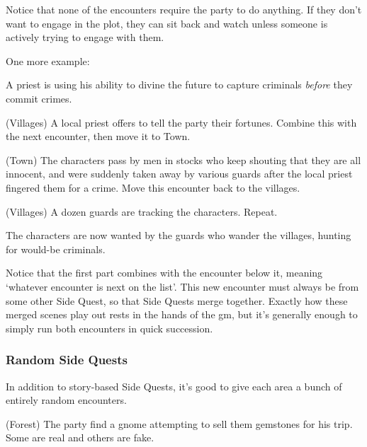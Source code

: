 \begin{multicols}{2}
Notice that none of the encounters require the party to do anything.
If they don't want to engage in the plot, they can sit back and watch unless someone is actively trying to engage with them.

One more example:

\begin{exampletext}

A priest is using his ability to divine the future to capture criminals \emph{before} they commit crimes.

\end{exampletext}

\begin{list}{\Square}{}

\item[\CheckedBox]{(Villages) A local priest offers to tell the party their fortunes.  Combine this with the next encounter, then move it to Town.}

\item{(Town) The characters pass by men in stocks who keep shouting that they are all innocent, and were suddenly taken away by various guards after the local priest fingered them for a crime.  Move this encounter back to the villages.}

\item{(Villages) A dozen guards are tracking the characters. Repeat.}

\end{list}

The characters are now wanted by the guards who wander the villages, hunting for would-be criminals.

Notice that the first part combines with the encounter below it, meaning `whatever encounter is next on the list'.
This new encounter must always be from some other Side Quest, so that Side Quests merge together.
Exactly how these merged scenes play out rests in the hands of the \gls{gm}, but it's generally enough to simply run both encounters in quick succession.

\subsubsection{Random Side Quests}

In addition to story-based Side Quests, it's good to give each area a bunch of entirely random encounters.

\begin{list}{\Square}{}

  \item{(Forest) The party find a gnome attempting to sell them gemstones for his trip. Some are real and others are fake.}


\end{list}
\end{multicols}

